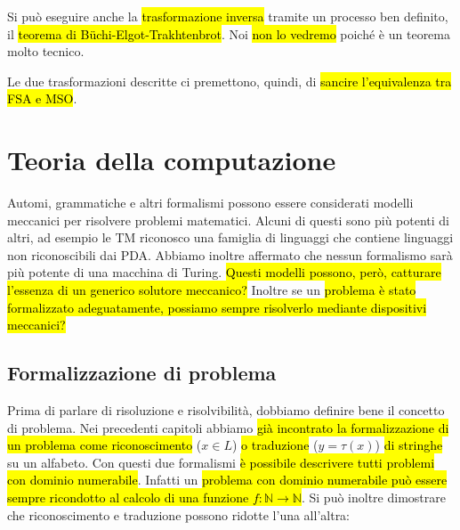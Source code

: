 \documentclass[a4paper,11pt,oneside]{article}
\theoremstyle{plain}
\theoremstyle{definition}
\theoremstyle{remark}
\begin{document}
Si può eseguire anche la \hl{trasformazione inversa} tramite un processo ben
definito, il \hl{teorema di Büchi-Elgot-Trakhtenbrot}. Noi \hl{non lo vedremo}
poiché è un teorema molto tecnico.

Le due trasformazioni descritte ci premettono, quindi, di \hl{sancire
l'equivalenza tra FSA e MSO}\@.

\section{Teoria della computazione}\label{sec:teoria-computazione}

Automi, grammatiche e altri formalismi possono essere considerati modelli
meccanici per risolvere problemi matematici. Alcuni di questi sono più potenti
di altri, ad esempio le TM riconosco una famiglia di linguaggi che contiene
linguaggi non riconoscibili dai PDA\@. Abbiamo inoltre affermato che nessun
formalismo sarà più potente di una macchina di Turing. \hl{Questi modelli
possono, però, catturare l'essenza di un generico solutore meccanico?} Inoltre
se un \hl{problema è stato formalizzato adeguatamente, possiamo sempre
risolverlo mediante dispositivi meccanici?}

\subsection{Formalizzazione di problema}

Prima di parlare di risoluzione e risolvibilità, dobbiamo definire bene il
concetto di problema. Nei precedenti capitoli abbiamo \hl{già incontrato la
formalizzazione di un problema come riconoscimento} ($x \in L$) \hl{o
traduzione} ($y = \tau(x)$) \hl{di stringhe} su un alfabeto. Con questi due
formalismi \hl{è possibile descrivere tutti problemi con dominio numerabile}.
Infatti un \hl{problema con dominio numerabile può essere sempre ricondotto al
calcolo di una funzione $f: \mathbb{N} \to \mathbb{N}$}. Si può inoltre
dimostrare che riconoscimento e traduzione possono ridotte l'una all'altra:
\end{document}
